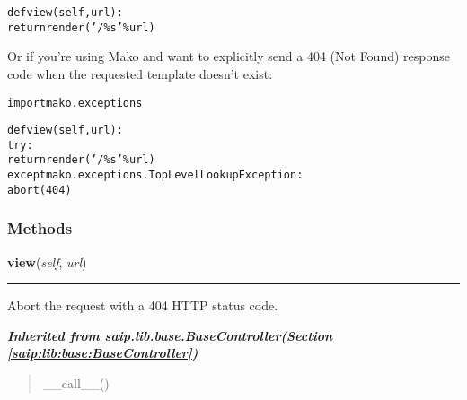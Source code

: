 \begin{alltt}
   def view(self, url):
       return render('/\%s' \% url)\end{alltt}

Or if you're using Mako and want to explicitly send a 404 (Not Found) 
response code when the requested template doesn't exist:

\begin{alltt}
   import mako.exceptions
   
   def view(self, url):
       try:
           return render('/\%s' \% url)
       except mako.exceptions.TopLevelLookupException:
           abort(404)\end{alltt}



  \subsubsection{Methods}

    \label{saip:controllers:template:TemplateController:view}

    \vspace{0.5ex}

\hspace{.8\funcindent}\begin{boxedminipage}{\funcwidth}

    \raggedright \textbf{view}(\textit{self}, \textit{url})

    \vspace{-1.5ex}

    \rule{\textwidth}{0.5\fboxrule}
\setlength{\parskip}{2ex}
    Abort the request with a 404 HTTP status code.

\setlength{\parskip}{1ex}
    \end{boxedminipage}


\large{\textbf{\textit{Inherited from saip.lib.base.BaseController\textit{(Section \ref{saip:lib:base:BaseController})}}}}

\begin{quote}
\_\_call\_\_()
\end{quote}
